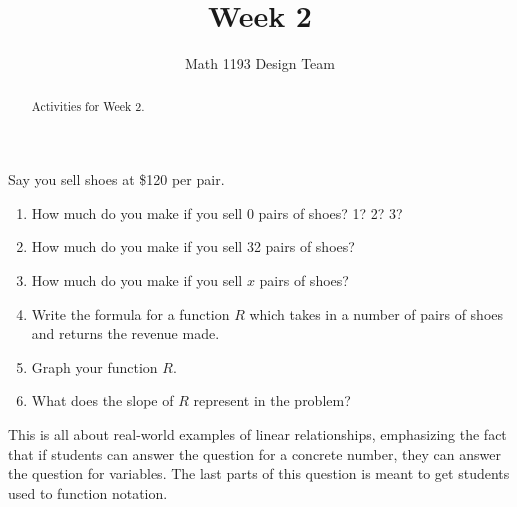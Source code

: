 \documentclass[noauthor]{ximera}
\title{Week 2}
\author{Math 1193 Design Team}
\begin{document}
\begin{abstract}
    Activities for Week 2.
\end{abstract}
\maketitle

\begin{problem}
Say you sell shoes at \$120 per pair.

\begin{enumerate}
    \item How much do you 
    make if you sell 0 pairs of shoes? 1? 2? 3? 
    \item How much do you 
    make if you sell 32 pairs of shoes?
    \item How much do you make if you sell \(x\)
    pairs of shoes?
    \item Write the formula for a function \(R\)
    which takes in a number of pairs of shoes and
    returns the revenue made.
    \item Graph your function \(R\).
    \item What does the slope of \(R\) represent
    in the problem?
\end{enumerate}

\begin{instructorNotes}
This is all about real-world examples of linear relationships,
emphasizing the fact that if students can answer the question 
for a concrete number, they can answer the question for 
variables. The last parts of this question is meant to 
get students used to function notation. 
\end{instructorNotes}

\end{problem}
\end{document}
